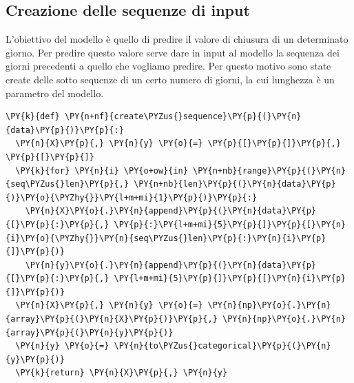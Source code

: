 \documentclass[12pt,a4paper,twoside,openright]{book}
\begin{document}
\subsection{Creazione delle sequenze di input}
L’obiettivo del modello è quello di predire il valore di chiusura di un determinato giorno. Per predire questo valore serve dare in input al modello la sequenza dei giorni precedenti a quello che vogliamo predire.
Per questo motivo sono state create delle sotto sequenze di un certo numero di giorni, la cui lunghezza è un parametro del modello.


\begin{Verbatim}[commandchars=\\\{\}]
\PY{k}{def} \PY{n+nf}{create\PYZus{}sequence}\PY{p}{(}\PY{n}{data}\PY{p}{)}\PY{p}{:}
  \PY{n}{X}\PY{p}{,} \PY{n}{y} \PY{o}{=} \PY{p}{[}\PY{p}{]}\PY{p}{,} \PY{p}{[}\PY{p}{]}
  \PY{k}{for} \PY{n}{i} \PY{o+ow}{in} \PY{n+nb}{range}\PY{p}{(}\PY{n}{seq\PYZus{}len}\PY{p}{,} \PY{n+nb}{len}\PY{p}{(}\PY{n}{data}\PY{p}{)}\PY{o}{\PYZhy{}}\PY{l+m+mi}{1}\PY{p}{)}\PY{p}{:}
    \PY{n}{X}\PY{o}{.}\PY{n}{append}\PY{p}{(}\PY{n}{data}\PY{p}{[}\PY{p}{:}\PY{p}{,} \PY{p}{:}\PY{l+m+mi}{5}\PY{p}{]}\PY{p}{[}\PY{n}{i}\PY{o}{\PYZhy{}}\PY{n}{seq\PYZus{}len}\PY{p}{:}\PY{n}{i}\PY{p}{]}\PY{p}{)}
    \PY{n}{y}\PY{o}{.}\PY{n}{append}\PY{p}{(}\PY{n}{data}\PY{p}{[}\PY{p}{:}\PY{p}{,} \PY{l+m+mi}{5}\PY{p}{]}\PY{p}{[}\PY{n}{i}\PY{p}{]}\PY{p}{)}
  \PY{n}{X}\PY{p}{,} \PY{n}{y} \PY{o}{=} \PY{n}{np}\PY{o}{.}\PY{n}{array}\PY{p}{(}\PY{n}{X}\PY{p}{)}\PY{p}{,} \PY{n}{np}\PY{o}{.}\PY{n}{array}\PY{p}{(}\PY{n}{y}\PY{p}{)}
  \PY{n}{y} \PY{o}{=} \PY{n}{to\PYZus{}categorical}\PY{p}{(}\PY{n}{y}\PY{p}{)}
  \PY{k}{return} \PY{n}{X}\PY{p}{,} \PY{n}{y}
\end{Verbatim}
\end{document}
